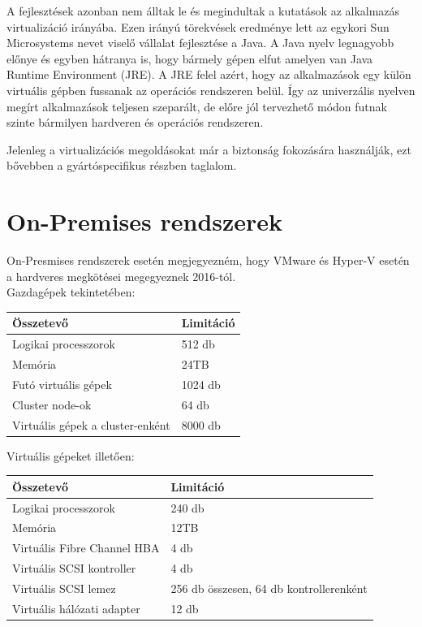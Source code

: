 \documentclass[12pt,oneside,justify,table]{book}
\begin{document}
A fejlesztések azonban nem álltak le és megindultak a kutatások az alkalmazás virtualizáció irányába. 
Ezen irányú törekvések eredménye lett az egykori Sun Microsystems nevet viselő vállalat fejlesztése a Java. 
A Java nyelv legnagyobb előnye és egyben hátranya is, hogy bármely gépen elfut amelyen van Java Runtime Environment (JRE). 
A JRE felel azért, hogy az alkalmazások egy külön virtuális gépben fussanak az operációs rendszeren belül. 
Így az univerzális nyelven megírt alkalmazások teljesen szeparált, de előre jól tervezhető módon futnak szinte bármilyen hardveren és operációs rendszeren.

Jelenleg a virtualizációs megoldásokat már a biztonság fokozására használják, ezt bővebben a gyártóspecifikus részben taglalom.

\section{On-Premises rendszerek}
\noindent On-Presmises rendszerek esetén megjegyezném, hogy VMware és Hyper-V esetén a hardveres megkötései megegyeznek 2016-tól. \cite{VMwareLimits} \cite{Hyper-VLimits}\\

\noindent Gazdagépek tekintetében: \\
\begin{table}[ht]
\centering
	\begin{tabular}{l | l}
		\textbf{Összetevő} & \textbf{Limitáció} \\
		\hline
		Logikai processzorok & 512 db \\
		Memória & 24TB \\
		Futó virtuális gépek & 1024 db \\
		Cluster node-ok & 64 db \\
		Virtuális gépek a cluster-enként & 8000 db\\
	\end{tabular}
\end{table}

\noindent Virtuális gépeket illetően:
\begin{table}[ht]
\centering
	\begin{tabular}{l | l}
		\textbf{Összetevő} & \textbf{Limitáció} \\
		\hline
		Logikai processzorok & 240 db \\
		Memória & 12TB \\
		Virtuális Fibre Channel HBA & 4 db \\
		Virtuális SCSI kontroller & 4 db \\
		Virtuális SCSI lemez & 256 db összesen, 64 db kontrollerenként \\
		Virtuális hálózati adapter & 12 db \\
	\end{tabular}
\end{table}
\end{document}
